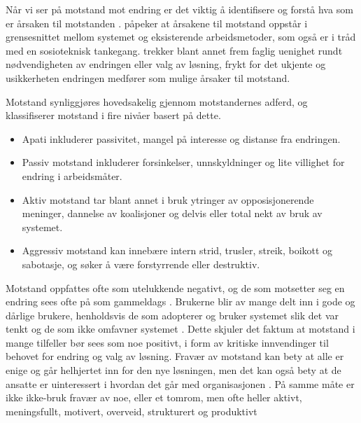 \noindent
Når vi ser på motstand mot endring er det viktig å identifisere og forstå hva som er årsaken til motstanden \citep{Lapointe05}. \citet{Timmons03} påpeker at årsakene til motstand oppstår i grensesnittet mellom systemet og eksisterende arbeidsmetoder, som også er i tråd med en sosioteknisk tankegang. \citet{Jacobsen12} trekker blant annet frem faglig uenighet rundt nødvendigheten av endringen eller valg av løsning, frykt for det ukjente og usikkerheten endringen medfører som mulige årsaker til motstand.
 
\noindent
Motstand synliggjøres hovedsakelig gjennom motstandernes adferd, og \citet{Lapointe05} klassifiserer motstand i fire nivåer basert på dette.
 
\begin{itemize}
\item Apati inkluderer passivitet, mangel på interesse og distanse fra endringen.
\item Passiv motstand inkluderer forsinkelser, unnskyldninger og lite villighet for endring i arbeidsmåter.
\item Aktiv motstand tar blant annet i bruk ytringer av opposisjonerende meninger, dannelse av koalisjoner og delvis eller total nekt av bruk av systemet.
\item Aggressiv motstand kan innebære intern strid, trusler, streik, boikott og sabotasje, og søker å være forstyrrende eller destruktiv.
\end{itemize} 
 
\noindent
Motstand oppfattes ofte som utelukkende negativt, og de som motsetter seg en endring sees ofte på som gammeldags \citep{Jacobsen12}. Brukerne blir av mange delt inn i gode og  dårlige brukere, henholdsvis de som adopterer og bruker systemet slik det var tenkt og de som ikke omfavner systemet \citep{Satchell09}. Dette skjuler det faktum at motstand i mange tilfeller bør sees som noe positivt, i form av kritiske innvendinger til behovet for endring og valg av løsning. Fravær av motstand kan bety at alle er enige og går helhjertet inn for den nye løsningen, men det kan også bety at de ansatte er uinteressert i hvordan det går med organisasjonen \citep{Jacobsen12}. På samme måte er ikke ikke-bruk fravær av noe, eller et tomrom, men ofte heller aktivt, meningsfullt, motivert, overveid, strukturert og produktivt \citep{Satchell09}
 
